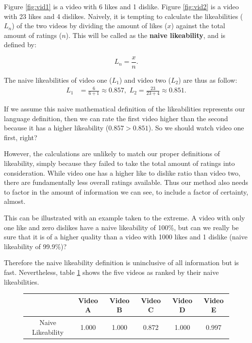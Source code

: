 \documentclass[a4paper,11pt]{article}
\begin{document}
Figure \ref{fig:vid1} is a video with 6 likes and 1 dislike. Figure \ref{fig:vid2} is a video with 23 likes and 4 dislikes. Naively, it is tempting to calculate the likeabilities ($L_n$) of the two videos by dividing the amount of likes ($x$) against the total amount of ratings ($n$). This will be called as the \textbf{naive likeability}, and is defined by:

\[
L_n = \frac{x}{n}.
\]

The naive likeabilities of video one ($L_1$) and video two ($L_2$) are thus as follow:
\begin{align*}
    L_{1} &= \frac{6}{6+1} \approx 0.857, \,\, L_{2} = \frac{23}{23 + 4} \approx 0.851.
\end{align*}

If we assume this naive mathematical definition of the likeabilities represents our language definition, then we can rate the first video higher than the second because it has a higher likeability ($0.857 > 0.851$). So we should watch video one first, right?

However, the calculations are unlikely to match our proper definitions of likeability, simply because they failed to take the total amount of ratings into consideration. While video one has a higher like to dislike ratio than video two, there are fundamentally less overall ratings available. Thus our method also needs to factor in the amount of information we can see, to include a factor of certainty, almost.

This can be illustrated with an example taken to the extreme. A video with only one like and zero dislikes have a naive likeability of 100\%, but can we really be sure that it is of a higher quality than a video with 1000 likes and 1 dislike (naive likeability of 99.9\%)?

Therefore the naive likeability definition is uninclusive of all information but is fast. Nevertheless, table \ref{tbl:naive} shows the five videos as ranked by their naive likeabilities.

\begin{figure}[H]
    \centering
    \begin{tabular}{c|c|c|c|c|c}
        & Video A & Video B & Video C & Video D & Video E \\
        \hline
        \hline
        Naive Likeability & 1.000 & 1.000 & 0.872 & 1.000 & 0.997
    \end{tabular}
    \label{tbl:naive}
\end{figure}
\end{document}
